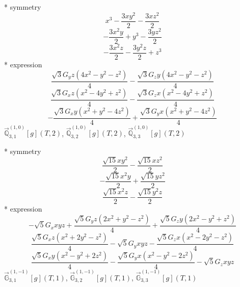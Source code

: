\documentclass[fleqn,8pt]{jsarticle}
\begin{document}
\noindent\quad ** symmetry
\begin{dmath*}
x^{3} - \frac{3 x y^{2}}{2} - \frac{3 x z^{2}}{2}
\end{dmath*}
\begin{dmath*}
- \frac{3 x^{2} y}{2} + y^{3} - \frac{3 y z^{2}}{2}
\end{dmath*}
\begin{dmath*}
- \frac{3 x^{2} z}{2} - \frac{3 y^{2} z}{2} + z^{3}
\end{dmath*}
\noindent\quad ** expression
\begin{dmath*}
\frac{\sqrt{3} G_{y} z \left(4 x^{2} - y^{2} - z^{2}\right)}{4} - \frac{\sqrt{3} G_{z} y \left(4 x^{2} - y^{2} - z^{2}\right)}{4}
\end{dmath*}
\begin{dmath*}
\frac{\sqrt{3} G_{x} z \left(x^{2} - 4 y^{2} + z^{2}\right)}{4} - \frac{\sqrt{3} G_{z} x \left(x^{2} - 4 y^{2} + z^{2}\right)}{4}
\end{dmath*}
\begin{dmath*}
- \frac{\sqrt{3} G_{x} y \left(x^{2} + y^{2} - 4 z^{2}\right)}{4} + \frac{\sqrt{3} G_{y} x \left(x^{2} + y^{2} - 4 z^{2}\right)}{4}
\end{dmath*}
\noindent\quad $\vec{\mathbb{Q}}_{3,1}^{(1,0)}[g](T,2)$, $\vec{\mathbb{Q}}_{3,2}^{(1,0)}[g](T,2)$, $\vec{\mathbb{Q}}_{3,3}^{(1,0)}[g](T,2)$

\noindent\quad ** symmetry
\begin{dmath*}
\frac{\sqrt{15} x y^{2}}{2} - \frac{\sqrt{15} x z^{2}}{2}
\end{dmath*}
\begin{dmath*}
- \frac{\sqrt{15} x^{2} y}{2} + \frac{\sqrt{15} y z^{2}}{2}
\end{dmath*}
\begin{dmath*}
\frac{\sqrt{15} x^{2} z}{2} - \frac{\sqrt{15} y^{2} z}{2}
\end{dmath*}
\noindent\quad ** expression
\begin{dmath*}
- \sqrt{5} G_{x} x y z + \frac{\sqrt{5} G_{y} z \left(2 x^{2} + y^{2} - z^{2}\right)}{4} + \frac{\sqrt{5} G_{z} y \left(2 x^{2} - y^{2} + z^{2}\right)}{4}
\end{dmath*}
\begin{dmath*}
\frac{\sqrt{5} G_{x} z \left(x^{2} + 2 y^{2} - z^{2}\right)}{4} - \sqrt{5} G_{y} x y z - \frac{\sqrt{5} G_{z} x \left(x^{2} - 2 y^{2} - z^{2}\right)}{4}
\end{dmath*}
\begin{dmath*}
\frac{\sqrt{5} G_{x} y \left(x^{2} - y^{2} + 2 z^{2}\right)}{4} - \frac{\sqrt{5} G_{y} x \left(x^{2} - y^{2} - 2 z^{2}\right)}{4} - \sqrt{5} G_{z} x y z
\end{dmath*}
\noindent\quad $\vec{\mathbb{G}}_{3,1}^{(1,-1)}[g](T,1)$, $\vec{\mathbb{G}}_{3,2}^{(1,-1)}[g](T,1)$, $\vec{\mathbb{G}}_{3,3}^{(1,-1)}[g](T,1)$
\end{document}
